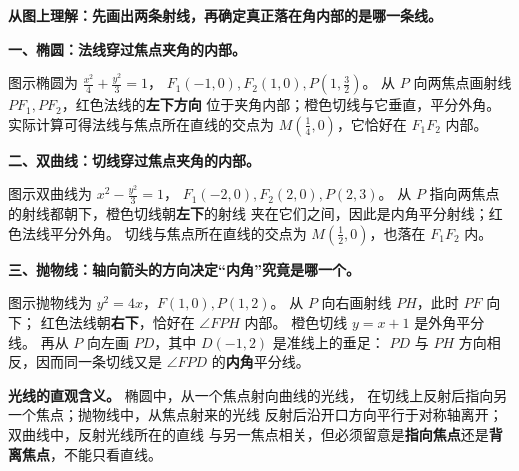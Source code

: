\clearpage
\begin{explanationbox}
\textbf{从图上理解：先画出两条射线，再确定真正落在角内部的是哪一条线。}

\begin{minipage}{\linewidth}
\textbf{一、椭圆：法线穿过焦点夹角的内部。}
\begin{center}\end{center}
图示椭圆为 $\tfrac{x^2}{4}+\tfrac{y^2}{3}=1$，
$F_1(-1,0),F_2(1,0),P(1,\tfrac32)$。
从 $P$ 向两焦点画射线 $PF_1,PF_2$，红色法线的\textbf{左下方向}
位于夹角内部；橙色切线与它垂直，平分外角。
实际计算可得法线与焦点所在直线的交点为
$M(\tfrac14,0)$，它恰好在 $F_1F_2$ 内部。
\end{minipage}\par\medskip

\begin{minipage}{\linewidth}
\textbf{二、双曲线：切线穿过焦点夹角的内部。}
\begin{center}\end{center}
图示双曲线为 $x^2-\tfrac{y^2}{3}=1$，
$F_1(-2,0),F_2(2,0),P(2,3)$。
从 $P$ 指向两焦点的射线都朝下，橙色切线朝\textbf{左下}的射线
夹在它们之间，因此是内角平分射线；红色法线平分外角。
切线与焦点所在直线的交点为 $M(\tfrac12,0)$，也落在 $F_1F_2$ 内。
\end{minipage}\par\medskip

\begin{minipage}{\linewidth}
\textbf{三、抛物线：轴向箭头的方向决定“内角”究竟是哪一个。}
\begin{center}\end{center}
图示抛物线为 $y^2=4x$，$F(1,0),P(1,2)$。
从 $P$ 向右画射线 $PH$，此时 $PF$ 向下；
红色法线朝\textbf{右下}，恰好在 $\angle FPH$ 内部。
橙色切线 $y=x+1$ 是外角平分线。
再从 $P$ 向左画 $PD$，其中 $D(-1,2)$ 是准线上的垂足：
$PD$ 与 $PH$ 方向相反，因而同一条切线又是 $\angle FPD$ 的\textbf{内角}平分线。
\end{minipage}

\textbf{光线的直观含义。} 椭圆中，从一个焦点射向曲线的光线，
在切线上反射后指向另一个焦点；抛物线中，从焦点射来的光线
反射后沿开口方向平行于对称轴离开；双曲线中，反射光线所在的直线
与另一焦点相关，但必须留意是\textbf{指向焦点}还是\textbf{背离焦点}，不能只看直线。
\end{explanationbox}
